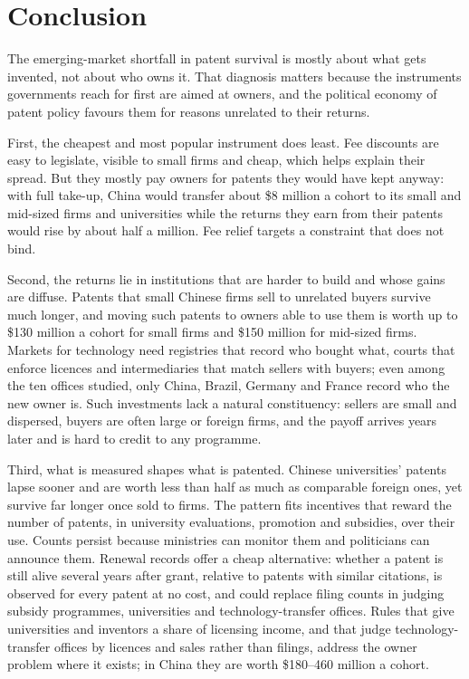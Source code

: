 \section{Conclusion}\label{sec:conclusion}

The emerging-market shortfall in patent survival is mostly about what gets invented, not about who owns it. That
diagnosis matters because the instruments governments reach for first are aimed at owners, and the political
economy of patent policy favours them for reasons unrelated to their returns.

First, the cheapest and most popular instrument does least. Fee discounts are easy to legislate, visible to small
firms and cheap, which helps explain their spread. But they mostly pay owners for patents they would have kept
anyway: with full take-up, China would transfer about \$8 million a cohort to its small and mid-sized firms and universities while the returns they earn from their patents would rise by about half a million. Fee relief targets a constraint
that does not bind.

Second, the returns lie in institutions that are harder to build and whose gains are diffuse. Patents that small
Chinese firms sell to unrelated buyers survive much longer, and moving such patents to owners able to use them is
worth up to \$130 million a cohort for small firms and \$150 million for mid-sized firms. Markets for technology need registries that record who bought what, courts
that enforce licences and intermediaries that match sellers with buyers; even among the ten offices studied, only
China, Brazil, Germany and France record who the new owner is. Such investments lack a natural constituency: sellers are
small and dispersed, buyers are often large or foreign firms, and the payoff arrives years later and is hard to
credit to any programme.

Third, what is measured shapes what is patented. Chinese universities' patents lapse sooner and are worth less than
half as much as comparable foreign ones, yet survive far longer once sold to firms. The pattern fits incentives that
reward the number of patents, in university evaluations, promotion and subsidies, over their use. Counts persist
because ministries can monitor them and politicians can announce them. Renewal records offer a cheap alternative:
whether a patent is still alive several years after grant, relative to patents with similar citations, is observed
for every patent at no cost, and could replace filing counts in judging subsidy programmes, universities and
technology-transfer offices. Rules that give universities and inventors a share of licensing income, and that judge
technology-transfer offices by licences and sales rather than filings, address the owner problem where it exists;
in China they are worth \$180--460 million a cohort.

